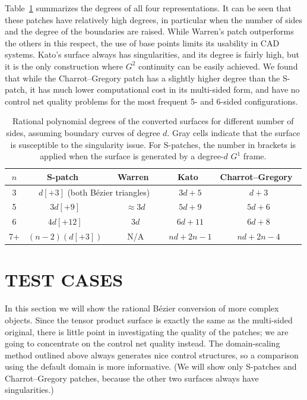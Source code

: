 \documentclass[9pt,academicons]{article}
\begin{document}
Table~\ref{tab:degrees} summarizes the degrees of all four representations.
It can be seen that these patches
have relatively high degrees, in particular when the number of sides and the degree of the
boundaries are raised. While Warren's patch outperforms the others in this respect,
the use of base points limits its usability in CAD systems.
Kato's surface always has singularities, and its degree is fairly high, but it is the only
construction where $G^2$ continuity can be easily achieved. We found that while the
Charrot--Gregory patch has a slightly higher degree than the S-patch, it has much lower
computational cost in its multi-sided form, and have no control net quality problems for
the most frequent 5- and 6-sided configurations.
\begin{table}
  \centering
  \begin{tabular}{c|c|c|c|c}
    $n$ & S-patch~\cite{Loop:1989} & Warren~\cite{Warren:1992} & Kato~\cite{Kato:1991} & Charrot--Gregory~\cite{Charrot:1984} \\ \hline
    3 & \multicolumn{2}{c|}{$d[+3]$ (both B\'ezier triangles)} & \cellcolor{light-gray}$3d+5$ & $d+3$ \\ \hline
    5 & \cellcolor{light-light-gray}$3d[+9]$ & $\approx 3d$ & \cellcolor{light-gray}$5d+9$ & $5d+6$ \\ \hline
    6 & \cellcolor{light-light-gray}$4d[+12]$ & $3d$ & \cellcolor{light-gray}$6d+11$ & $6d+8$ \\ \hline
    7+ & \cellcolor{light-gray}$(n-2)(d[+3])$ & $\qquad$N/A$\qquad$ & \cellcolor{light-gray}$nd+2n-1$ & \cellcolor{light-gray}$nd+2n-4$ \\ \hline
  \end{tabular}
  \caption{Rational polynomial degrees of the converted surfaces for different number of sides,
    assuming boundary curves of degree $d$. Gray cells indicate that the surface is susceptible to
    the singularity issue.
    For S-patches, the number in brackets is applied
    when the surface is generated by a degree-$d$ $G^1$ frame.}
  \label{tab:degrees}
\end{table}

\section{TEST CASES}
\label{sec:tests}
In this section we will show the rational B\'ezier conversion of more complex objects.
Since the tensor product surface is exactly the same as the multi-sided original,
there is little point in investigating the quality of the patches;
we are going to concentrate on the control net quality instead.
The domain-scaling method outlined above always generates nice control structures,
so a comparison using the default domain is more informative.
(We will show only S-patches and Charrot--Gregory patches,
because the other two surfaces always have singularities.)
\end{document}
